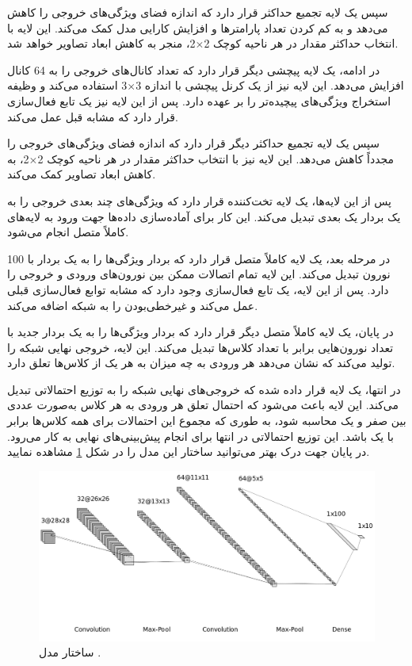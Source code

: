 سپس یک لایه تجمیع حداکثر%
قرار دارد که اندازه فضای ویژگی‌های خروجی را کاهش می‌دهد و به کم کردن تعداد پارامترها و افزایش کارایی مدل کمک می‌کند. این لایه با انتخاب حداکثر مقدار در هر ناحیه کوچک
2$\times$2،
منجر به کاهش ابعاد تصاویر خواهد شد.

در ادامه، یک لایه پیچشی دیگر قرار دارد که تعداد کانال‌های خروجی را به 64 کانال افزایش می‌دهد. این لایه نیز از یک کرنل پیچشی با اندازه
3$\times$3
استفاده می‌کند و وظیفه استخراج ویژگی‌های پیچیده‌تر را بر عهده دارد. پس از این لایه نیز یک تابع فعال‌سازی
قرار دارد که مشابه قبل عمل می‌کند.

سپس یک لایه تجمیع حداکثر دیگر قرار دارد که اندازه فضای ویژگی‌های خروجی را مجدداً کاهش می‌دهد. این لایه نیز با انتخاب حداکثر مقدار در هر ناحیه کوچک
2$\times$2،
به کاهش ابعاد تصاویر کمک می‌کند.

پس از این لایه‌ها، یک لایه تخت‌کننده قرار دارد که ویژگی‌های چند بعدی خروجی را به یک بردار یک بعدی تبدیل می‌کند. این کار برای آماده‌سازی داده‌ها جهت ورود به لایه‌های کاملاً متصل انجام می‌شود.

در مرحله بعد، یک لایه کاملاً متصل قرار دارد که بردار ویژگی‌ها را به یک بردار با 100 نورون تبدیل می‌کند. این لایه تمام اتصالات ممکن بین نورون‌های ورودی و خروجی را دارد. پس از این لایه، یک تابع فعال‌سازی
وجود دارد که مشابه توابع فعال‌سازی قبلی عمل می‌کند و غیرخطی‌بودن را به شبکه اضافه می‌کند.

در پایان، یک لایه کاملاً متصل دیگر قرار دارد که بردار ویژگی‌ها را به یک بردار جدید با تعداد نورون‌هایی برابر با تعداد کلاس‌ها تبدیل می‌کند. این لایه، خروجی نهایی شبکه را تولید می‌کند که نشان می‌دهد هر ورودی به چه میزان به هر یک از کلاس‌ها تعلق دارد.

در انتها، یک لایه
قرار داده شده که خروجی‌های نهایی شبکه را به توزیع احتمالاتی تبدیل می‌کند. این لایه باعث می‌شود که احتمال تعلق هر ورودی به هر کلاس به‌صورت عددی بین صفر و یک محاسبه شود، به طوری که مجموع این احتمالات برای همه کلاس‌ها برابر با یک باشد. این توزیع احتمالاتی در انتها برای انجام پیش‌بینی‌های نهایی به کار می‌رود. در پایان جهت درک بهتر می‌توانید ساختار این مدل را در شکل
\ref{cnn}
مشاهده نمایید.


\begin{figure}[b!]
	\centering
	\includegraphics[scale=0.463]{images/chap5/cnn.png}%
	\caption{
		ساختار مدل 
		.
	}
	\label{cnn}
	\centering
\end{figure}




